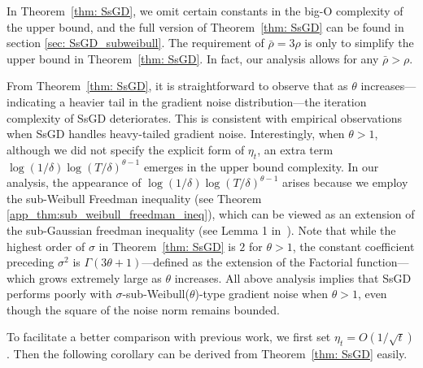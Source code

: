 \documentclass{article}
\begin{document}
In Theorem~\ref{thm: SsGD}, we omit certain constants in the big-O complexity of the upper bound, and the full version of Theorem~\ref{thm: SsGD} can be found in section \ref{sec: SsGD_subweibull}. The requirement of $\bar{\rho}=3\rho$ is only to simplify the upper bound in Theorem~\ref{thm: SsGD}. In fact, our analysis allows for any $\bar{\rho}>\rho$.

From Theorem~\ref{thm: SsGD}, it is straightforward to observe that as $\theta$ increases—indicating a heavier tail in the gradient noise distribution—the iteration complexity of SsGD deteriorates. This is consistent with empirical observations when SsGD handles heavy-tailed gradient noise. Interestingly, when $\theta>1$, although we did not specify the explicit form of $\eta_t$, an extra term $\log(1/\delta)\log(T/\delta)^{\theta-1}$ emerges in the upper bound complexity. In our analysis, the appearance of $\log(1/\delta)\log(T/\delta)^{\theta-1}$ arises because we employ the sub-Weibull Freedman inequality (see Theorem \ref{app_thm:sub_weibull_freedman_ineq}), which can be viewed as an extension of the sub-Gaussian freedman inequality (see Lemma 1 in~\citep{lixiaoyu_2020}). Note that while the highest order of $\sigma$ in Theorem~\ref{thm: SsGD} is $2$ for $\theta > 1$, the constant coefficient preceding $\sigma^2$ is $\Gamma(3\theta + 1)$—defined as the extension of the Factorial function—which grows extremely large as $\theta$ increases. All above analysis implies that SsGD performs poorly with $\sigma$-sub-Weibull($\theta$)-type gradient noise when $\theta > 1$, even though the square of the noise norm remains bounded.

To facilitate a better comparison with previous work, we first set $\eta_t=O(1/\sqrt{t})$. Then the following corollary can be derived from Theorem~\ref{thm: SsGD} easily.
\end{document}
